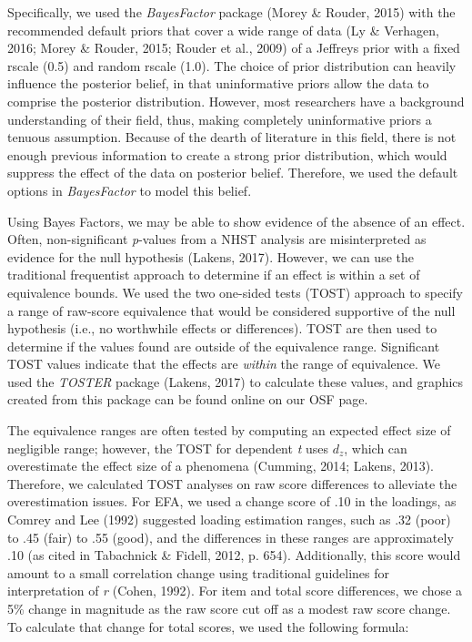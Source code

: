 \documentclass[english,man]{apa6}
\theoremstyle{definition}
\theoremstyle{definition}
\theoremstyle{definition}
\theoremstyle{remark}
\begin{document}
Specifically, we used the \emph{BayesFactor} package (Morey \& Rouder,
2015) with the recommended default priors that cover a wide range of
data (Ly \& Verhagen, 2016; Morey \& Rouder, 2015; Rouder et al., 2009)
of a Jeffreys prior with a fixed rscale (0.5) and random rscale (1.0).
The choice of prior distribution can heavily influence the posterior
belief, in that uninformative priors allow the data to comprise the
posterior distribution. However, most researchers have a background
understanding of their field, thus, making completely uninformative
priors a tenuous assumption. Because of the dearth of literature in this
field, there is not enough previous information to create a strong prior
distribution, which would suppress the effect of the data on posterior
belief. Therefore, we used the default options in \emph{BayesFactor} to
model this belief.

Using Bayes Factors, we may be able to show evidence of the absence of
an effect. Often, non-significant \emph{p}-values from a NHST analysis
are misinterpreted as evidence for the null hypothesis (Lakens, 2017).
However, we can use the traditional frequentist approach to determine if
an effect is within a set of equivalence bounds. We used the two
one-sided tests (TOST) approach to specify a range of raw-score
equivalence that would be considered supportive of the null hypothesis
(i.e., no worthwhile effects or differences). TOST are then used to
determine if the values found are outside of the equivalence range.
Significant TOST values indicate that the effects are \emph{within} the
range of equivalence. We used the \emph{TOSTER} package (Lakens, 2017)
to calculate these values, and graphics created from this package can be
found online on our OSF page.

The equivalence ranges are often tested by computing an expected effect
size of negligible range; however, the TOST for dependent \emph{t} uses
\(d_z\), which can overestimate the effect size of a phenomena (Cumming,
2014; Lakens, 2013). Therefore, we calculated TOST analyses on raw score
differences to alleviate the overestimation issues. For EFA, we used a
change score of .10 in the loadings, as Comrey and Lee (1992) suggested
loading estimation ranges, such as .32 (poor) to .45 (fair) to .55
(good), and the differences in these ranges are approximately .10 (as
cited in Tabachnick \& Fidell, 2012, p. 654). Additionally, this score
would amount to a small correlation change using traditional guidelines
for interpretation of \emph{r} (Cohen, 1992). For item and total score
differences, we chose a 5\% change in magnitude as the raw score cut off
as a modest raw score change. To calculate that change for total scores,
we used the following formula:
\end{document}
